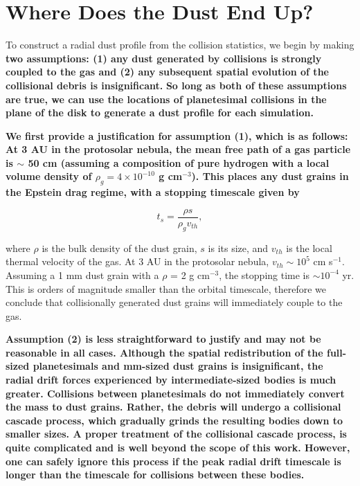 \documentclass[fleqn,usenatbib]{mnras}
\begin{document}
\section{Where Does the Dust End Up?}\label{sec:dust}

To construct a radial dust profile from the collision statistics, we begin by making \textbf{two assumptions: (1) any dust generated by collisions is strongly coupled to the gas and (2) any subsequent spatial evolution of the collisional debris is insignificant.} \textbf{So long as both of these assumptions are true, we can use the locations of planetesimal collisions in the plane of the disk to generate a dust profile for each simulation.}

\textbf{We first provide a justification for assumption (1), which is as follows: At 3 AU in the protosolar nebula, the mean free path of a gas particle is $\sim$ 50 cm (assuming a composition of pure hydrogen with a local volume density of $\rho_{g} = 4 \times 10^{-10}$ g cm$^{-3}$). This places any dust grains in the Epstein drag regime, with a stopping timescale given by}

\begin{equation}\label{eq:ts_epstein}
    t_{s} = \frac{\rho s}{\rho_{g} v_{th}},
\end{equation}

\noindent where $\rho$ is the bulk density of the dust grain, $s$ is its size, and $v_{th}$ is the local thermal velocity of the gas. At 3 AU in the protosolar nebula, $v_{th} \sim 10^{5}$ cm s$^{-1}$. Assuming a 1 mm dust grain with a $\rho$ = 2 g cm$^{-3}$, the stopping time is $\sim 10^{-4}$ yr.  This is orders of magnitude smaller than the 
orbital timescale, therefore we conclude that collisionally generated dust grains will immediately couple to the gas.

\textbf{Assumption (2) is less straightforward to justify and may not be reasonable in all cases. Although the spatial redistribution of the full-sized planetesimals and mm-sized dust grains is insignificant, the radial drift forces experienced by intermediate-sized bodies is much greater. Collisions between planetesimals do not immediately convert the mass to dust grains. Rather, the debris will undergo a collisional cascade process, which gradually grinds the resulting bodies down to smaller sizes. A proper treatment of the collisional cascade process, is quite complicated and is well beyond the scope of this work. However, one can safely ignore this process if the peak radial drift timescale is longer than the timescale for collisions between these bodies.}
\end{document}
